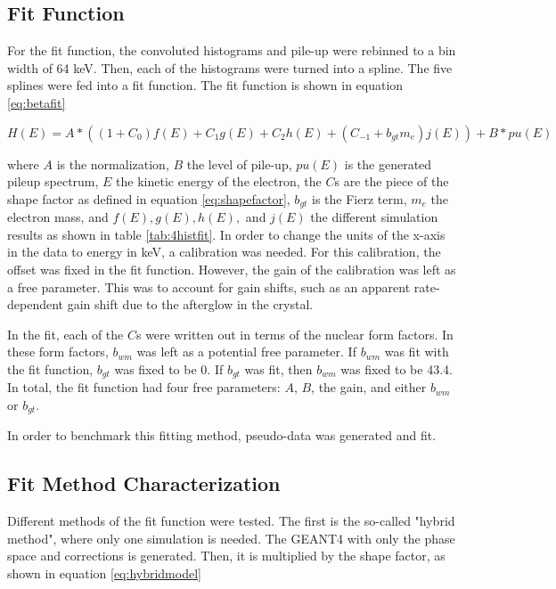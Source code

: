 \documentclass[main.tex]{subfiles}
\begin{document}
\subsection{Fit Function}
For the fit function, the convoluted histograms and pile-up were rebinned to a bin width of 64 keV.
Then, each of the histograms were turned into a spline. 
The five splines were fed into a fit function.
The fit function is shown in equation \ref{eq:betafit}

\begin{equation}
	H(E) = A * (( 1 + C_{0}) f(E) + C_{1}g(E) + C_{2} h(E) + (C_{-1} + b_{gt} m_{e}) j(E)) + B * pu(E)
	\label{eq:betafit}
\end{equation}
    
where $A$ is the normalization, $B$ the level of pile-up, $pu(E)$ is the generated pileup spectrum, $E$ the kinetic energy of the electron, the $C$s are the piece of the shape factor as defined in equation \ref{eq:shapefactor},  $b_{gt}$ is the Fierz term, $m_{e}$ the electron mass, and $f(E),g(E),h(E),$ and $j(E)$ the different simulation results as shown in table \ref{tab:4histfit}.
In order to change the units of the x-axis in the data to energy in keV, a calibration was needed.
For this calibration, the offset was fixed in the fit function.
However, the gain of the calibration was left as a free parameter.
This was to account for gain shifts, such as an apparent rate-dependent gain shift due to the afterglow in the crystal.

In the fit, each of the $C$s were written out in terms of the nuclear form factors.
In these form factors, $b_{wm}$ was left as a potential free parameter. 
If $b_{wm}$ was fit with the fit function, $b_{gt}$ was fixed to be 0. 
If $b_{gt}$ was fit, then $b_{wm}$ was fixed to be 43.4. 
In total, the fit function had four free parameters:
$A$, $B$, the gain, and either $b_{wm}$ or $b_{gt}$. 

In order to benchmark this fitting method, pseudo-data was generated and fit.


\subsection{Fit Method Characterization}
Different methods of the fit function were tested. 
The first is the so-called "hybrid method", where only one simulation is needed.
The GEANT4 with only the phase space and corrections is generated. 
Then, it is multiplied by the shape factor, as shown in equation \ref{eq:hybridmodel}
\end{document}
